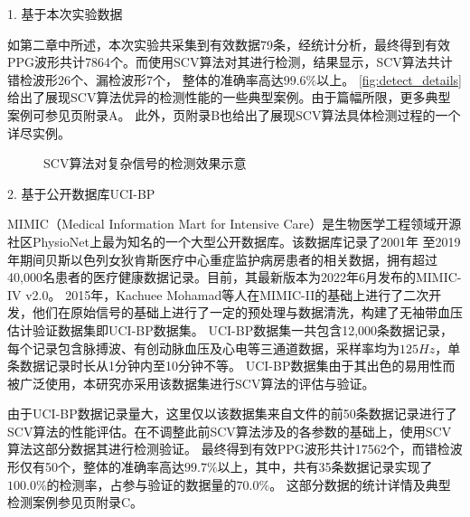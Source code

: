 1. 基于本次实验数据

如第二章中所述，本次实验共采集到有效数据79条，经统计分析，最终得到有效PPG波形共计7864个。而使用SCV算法对其进行检测，结果显示，SCV算法共计错检波形26个、漏检波形7个，
整体的准确率高达$99.6\%$以上。
\autoref{fig:detect_details}给出了展现SCV算法优异的检测性能的一些典型案例。由于篇幅所限，更多典型案例可参见\pageref{fig:detect_details2}页附录A。
此外，\pageref{fig:detectcheck}页附录B也给出了展现SCV算法具体检测过程的一个详尽实例。
\begin{figure}[h]
    \centering
    \quad
    \quad
    \quad
    \caption{\label{fig:detect_details}SCV算法对复杂信号的检测效果示意}
\end{figure}

2. 基于公开数据库UCI-BP

MIMIC（Medical Information Mart for Intensive Care）是生物医学工程领域开源社区PhysioNet上最为知名的一个大型公开数据库\cite{mit2022,Goldberger2000,johnson2018mimic}。该数据库记录了2001年
至2019年期间贝斯以色列女狄肯斯医疗中心重症监护病房患者的相关数据，拥有超过40,000名患者的医疗健康数据记录\cite{johnson2018mimic}。目前，其最新版本为2022年6月发布的MIMIC-IV v2.0\cite{mimic4}。
2015年，Kachuee Mohamad等人在MIMIC-II的基础上进行了二次开发，他们在原始信号的基础上进行了一定的预处理与数据清洗，构建了无袖带血压估计验证数据集即UCI-BP数据集\cite{Kachuee2015,ucibp2022}。
UCI-BP数据集一共包含12,000条数据记录，每个记录包含脉搏波、有创动脉血压及心电等三通道数据，采样率均为$125Hz$，单条数据记录时长从1分钟内至10分钟不等。
UCI-BP数据集由于其出色的易用性而被广泛使用，本研究亦采用该数据集进行SCV算法的评估与验证。

由于UCI-BP数据记录量大，这里仅以该数据集来自文件的前50条数据记录进行了SCV算法的性能评估。在不调整此前SCV算法涉及的各参数的基础上，使用SCV算法这部分数据其进行检测验证。
最终得到有效PPG波形共计17562个，而错检波形仅有50个，整体的准确率高达$99.7\%$以上，其中，共有35条数据记录实现了$100.0\%$的检测率，占参与验证的数据量的$70.0\%$。
这部分数据的统计详情及典型检测案例参见\pageref{tab:ucibp_details}页附录C。

